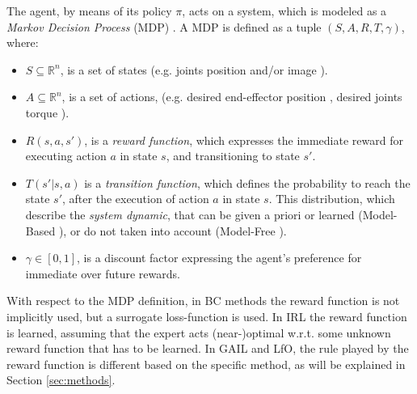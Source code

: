 The agent, by means of its policy $\pi$, acts on a system, which is modeled as a \textit{Markov Decision Process} (MDP) \cite{kroemer2021review_robot_learning}. A MDP is defined as a tuple $(S,A,R,T,\gamma)$, where:
\begin{itemize}
    \item $S \subseteq \mathbb{R}^{n}$, is a set of states (e.g. joints position \cite{} and/or image \cite{}).
    \item $A \subseteq \mathbb{R}^{n}$, is a set of actions, (e.g. desired end-effector position \cite{}, desired joints torque \cite{}).
    \item $R(s,a,s')$, is a \textit{reward function}, which expresses the immediate reward for executing action $a$ in state $s$, and transitioning to state $s'$.
    \item $T(s'|s,a)$ is a \textit{transition function}, which defines the probability to reach the state $s'$, after the execution of action $a$ in state $s$. This distribution, which describe the \textit{system dynamic}, that can be given a priori or learned (Model-Based \cite{}), or do not taken into account (Model-Free \cite{}).
    \item $\gamma \in [0,1]$, is a discount factor expressing the agent's preference for immediate over future rewards.
\end{itemize}
With respect to the MDP definition, in BC methods the reward function is not implicitly used, but a surrogate loss-function is used. In IRL the reward function is learned, assuming that the expert acts (near-)optimal w.r.t. some unknown reward function that has to be learned. In GAIL and LfO, the rule played by the reward function is different based on the specific method, as will be explained in Section \ref{sec:methods}.